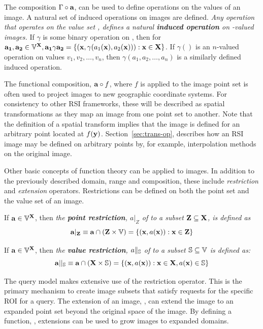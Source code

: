 \documentclass{ucdthesis}       %
\begin{document}
The composition $\Gamma\circ{\ensuremath{\bf{a}}}$, can be used to define operations
on the values of an image.  A natural set of induced operations on
images are defined. \emph{Any operation that operates on the value set
  , defines a natural {\bf induced operation} on -valued
  images.}  If $\gamma$ is some binary operation on , then for
${\bf{a_1}},{\bf{a_2}} \in {\ensuremath{\mathbb{V}}}^{{\bf{X}}},
{\bf{a_1}}\gamma{\ensuremath{\bf{a_2}}}=\{({\bf{x}},\gamma(a_1({\bf{x}}),a_2({\bf{x}}))) :
{\bf{x}}\in{\ensuremath{\bf{X}}}\}$.  If $\gamma()$ is an $n$-valued operation on
values $v_1,v_2,\ldots,v_n$, then $\gamma(a_1,a_2,\ldots,a_n)$ is a
similarly defined induced operation.

The functional composition, ${\bf{a}}\circ f$, where $f$ is applied to
the image point set is often used to project images to new geographic
coordinate systems.  For consistency to other \ac{RSI} frameworks,
these will be described as spatial transformations as they map an
image from one point set to another.  Note that the definition of a
spatial transform implies that the image is defined for an arbitrary
point located at $f({\bf{y}})$.  Section~\ref{sec:trans-op}, describes
how an \ac{RSI} image may be defined on arbitrary points by, for
example, interpolation methods on the original image.

Other basic concepts of function theory can be applied to images.  In
addition to the previously described domain, range and
composition, these include \emph{restriction} and
\emph{extension} operators.  Restrictions can be defined on both the
point set and the value set of an image.

If ${\bf{a}}\in{\ensuremath{\mathbb{V}}}^{{\bf{X}}}$, then \emph{the {\bf point restriction}, $a|_Z$ of
 to a subset ${\bf{Z}} \subseteq {\ensuremath{\bf{X}}}$, is defined as
\[{\bf{a}}|_{\bf{Z}}\equiv{\ensuremath{\bf{a}}} \cap ( {\bf{Z}} \times {\ensuremath{\mathbb{V}}} ) =\{({\bf{x}},a({\bf{x}})): {\bf{x}}\in{\ensuremath{\bf{Z}}}\}
\]}

If ${\bf{a}} \in {\ensuremath{\mathbb{V}}}^{{\bf{X}}}$, then \emph{the {\bf value restriction},
$a\|_{\mathbb{S}}$ of  to a subset ${\mathbb{S}} \subseteq {\ensuremath{\mathbb{V}}}$ is defined as:
\[{\bf{a}}||_{\mathbb{S}}\equiv{\ensuremath{\bf{a}}}\cap ({\bf{X}}\times{\ensuremath{\mathbb{S}}}) =\{({\bf{x}},a({\bf{x}})): {\bf{x}} \in {\ensuremath{\bf{X}}}, a({\bf{x}}) \in {\ensuremath{\mathbb{S}}}\}\]}

The query model makes extensive use of the restriction operator.  This
is the primary mechanism to create image subsets that satisfy requests
for the specific \acf{ROI} for a query.  The extension of an image,
, can extend the image to an expanded point set beyond the
original space of the image.  By defining a function, ,
extensions can be used to grow images to expanded domains.
\end{document}
